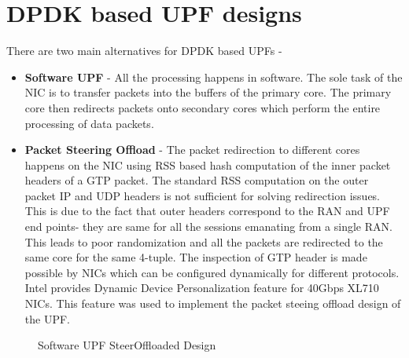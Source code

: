
\section{DPDK based UPF designs}
There are two main alternatives for DPDK based UPFs -
\begin{itemize}
	\item \textbf{Software UPF} - All the processing happens in software. The sole task of
	      the NIC is to transfer packets into the buffers of the primary core. The primary core then
	      redirects packets onto secondary cores which perform the entire processing of data packets.
	\item \textbf{Packet Steering Offload} - The packet redirection to different cores happens on the NIC using RSS based hash
	      computation of the inner packet headers of a GTP packet. The standard RSS computation on the outer packet IP and UDP headers is not sufficient for solving redirection issues. This is due to the fact that outer headers correspond to the RAN and UPF end points- they are same for all the sessions emanating from a single RAN. This leads to poor randomization and all the packets are redirected to the same core for the same 4-tuple. The inspection of GTP header is made possible by NICs which can be configured dynamically for different protocols. Intel provides Dynamic Device Personalization feature for 40Gbps XL710 NICs. This feature was used to implement the packet steeing offload design of the UPF.
\end{itemize}
\begin{figure}[htbp]
    \centering
    
    \caption{ Software UPF   SteerOffloaded Design}
        \label{figure:DesignAB}
    \end{figure}

